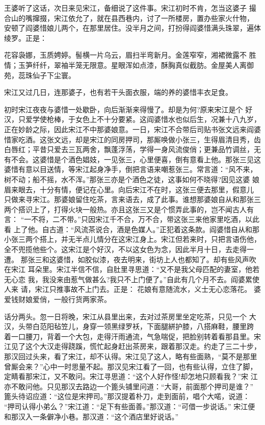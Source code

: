 王婆听了这话，次日来见宋江，备细说了这件事。宋江初时不肯，怎当这婆子
撮合山的嘴撺掇，宋江依允了，就在县西巷内，讨了一所楼房，置办些家火什物，
安顿了阎婆惜娘儿两个，在那里居住。没半月之间，打扮得阎婆惜满头珠翠，遍体
绫罗。正是：

花容袅娜，玉质娉婷。髻横一片乌云，眉扫半弯新月。金莲窄窄，湘裙微露不
胜情；玉笋纤纤，翠袖半笼无限意。星眼浑如点漆，酥胸真似截肪。金屋美人离御
苑，蕊珠仙子下尘寰。

宋江又过几日，连那婆子，也有若干头面衣服，端的养的婆惜丰衣足食。

初时宋江夜夜与婆惜一处歇卧，向后渐渐来得慢了。却是为何?原来宋江是个
好汉，只爱学使枪棒，于女色上不十分要紧。这阎婆惜水也似后生，况兼十八九岁，
正在妙龄之际，因此宋江不中那婆娘意。一日，宋江不合带后司贴书张文远来阎婆
惜家吃酒。这张文远，却是宋江的同房押司，那厮唤做小张三，生得眉清目秀，齿
白唇红；平昔只爱去三瓦两舍，飘蓬浮荡，学得一身风流俊俏；更兼品竹调丝，无
有不会。这婆惜是个酒色娼妓，一见张三，心里便喜，倒有意看上他。那张三见这
婆惜有意以目送情，等宋江起身净手，倒把言语来嘲惹张三。常言道：“风不来，
树不动；船不摇，水不浑。”那张三亦是个酒色之徒，这事如何不晓得?因见这婆
娘眉来眼去，十分有情，便记在心里。向后宋江不在时，这张三便去那里，假意儿
只做来寻宋江。那婆娘留住吃茶，言来语去，成了此事。谁想那婆娘自从和那张三
两个搭识上了，打得火块一般热。亦且这张三又是个惯弄此事的，岂不闻古人有言：
“一不将，二不带。”只因宋江千不合，万不合，带这张三来他家里吃酒，以此看
上了他。自古道：“风流茶说合，酒是色媒人。”正犯着这条款。阎婆惜自从和那
小张三两个搭上，并无半点儿情分在这宋江身上。宋江但若来时，只把言语伤他，
全不兜揽他些个。这宋江是个好汉，不以这女色为念，因此半月十日，去走得一遭。
那张三和这婆惜，如胶似漆，夜去明来，街坊上人也都知了。却有些风声吹在宋江
耳朵里。宋江半信不信，自肚里寻思道：“又不是我父母匹配的妻室，他若无心恋
我，我没来由惹气做甚么?我只不上门便了。”自此有几个月不去。阎婆累使人来
请，宋江只推事故不上门去。正是：
花娘有意随流水，义士无心恋落花。
婆爱钱财娘爱俏，一般行货两家茶。

话分两头。忽一日将晚，宋江从县里出来，去对过茶房里坐定吃茶，只见一个
大汉，头带白范阳毡笠儿，身穿一领黑绿罗袄，下面腿絣护膝，八搭麻鞋，腰里跨
着一口腰刀，背着一个大包，走得汗雨通流，气急喘促，把脸别转着看那县里。宋
江见了这个大汉走得跷蹊，慌忙起身赶出茶房来，跟着那汉走。约走了三二十步，
那汉回过头来，看了宋江，却不认得。宋江见了这人，略有些面熟，“莫不是那里
曾厮会来？”心中一时思量不起。那汉见宋江看了一回，也有些认得，立住了脚，
定睛看那宋江，又不敢问。宋江寻思道：“这个人好作怪!却怎地只顾看我？”宋
江亦不敢问他。只见那汉去路边一个篦头铺里问道：“大哥，前面那个押司是谁？”
篦头待诏应道：“这位是宋押司。”那汉提着朴刀，走到面前，唱个大喏，说道：
“押司认得小弟么？”宋江道：“足下有些面善。”那汉道：“可借一步说话。”
宋江便和那汉入一条僻净小巷。那汉道：“这个酒店里好说话。”

